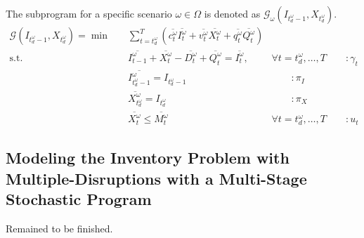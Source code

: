 \documentclass[11pt]{article}
\newcommand{\noi}{\noindent}
\begin{document}
		\noi The subprogram for a specific scenario \(\omega \in \Omega\) is denoted as \(\mathcal{G}_\omega(I_{t_d^\omega - 1},X_{t_d^\omega})\).
		\begin{align*}
			\mathcal{G}(I_{t_d^\omega - 1},X_{t_d^\omega}) = \min \quad & \sum_{t = t_d^\omega}^{T} (\overline{c_t^\omega} \overline{I_t^\omega} + \overline{v_t^\omega} \overline{X_t^\omega} + \overline{q_t^\omega} \overline{Q_t^\omega}) &\\
			\text{s.t.} \quad & \overline{I_{t-1}^\omega} + \overline{X_t^\omega} - \overline{D_t^\omega} + \overline{Q_t^\omega} = \overline{I_t^\omega}, & \forall t = t_d^\omega, \dots, T \qquad :\gamma_t\\
			& \overline{I_{t_d^\omega -1}^\omega} = I_{t_d^\omega - 1} & \qquad : \pi_I \\
			& \overline{X_{t_d^\omega}^\omega} = I_{t_d^\omega} & \qquad : \pi_X \\
			& \overline{X_t^\omega} \leq \overline{M_t^\omega} & \forall t = t_d^\omega, \dots, T \qquad: u_t
		\end{align*}
		
	\subsection{Modeling the Inventory Problem with Multiple-Disruptions with a Multi-Stage Stochastic Program}
	Remained to be finished.
		
\end{document}
